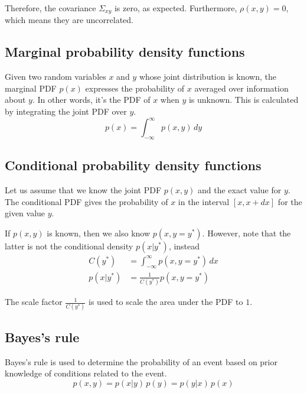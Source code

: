 Therefore, the covariance $\Sigma_{xy}$ is zero, as expected. Furthermore,
$\rho(x, y) = 0$, which means they are uncorrelated.

\subsection{Marginal probability density functions}

Given two random variables $x$ and $y$ whose joint distribution is known, the
marginal PDF $p(x)$ expresses the probability of $x$ averaged over information
about $y$. In other words, it's the PDF of $x$ when $y$ is unknown. This is
calculated by integrating the joint PDF over $y$.
\begin{equation*}
  p(x) = \int_{-\infty}^\infty p(x, y) \,dy
\end{equation*}

\subsection{Conditional probability density functions}

Let us assume that we know the joint PDF $p(x, y)$ and the exact value for $y$.
The conditional PDF gives the probability of $x$ in the interval $[x, x + dx]$
for the given value $y$.

If $p(x, y)$ is known, then we also know $p(x, y = y^\ast)$. However, note that
the latter is not the conditional density $p(x|y^\ast)$, instead
\begin{align*}
  C(y^\ast) &= \int_{-\infty}^\infty p(x, y = y^\ast) \,dx \\
  p(x|y^\ast) &= \frac{1}{C(y^\ast)} p(x, y = y^\ast)
\end{align*}

The scale factor $\frac{1}{C(y^\ast)}$ is used to scale the area under the PDF
to $1$.

\subsection{Bayes's rule}

Bayes's rule is used to determine the probability of an event based on prior
knowledge of conditions related to the event.
\begin{equation*}
  p(x, y) = p(x|y) \,p(y) = p(y|x) \,p(x)
\end{equation*}

